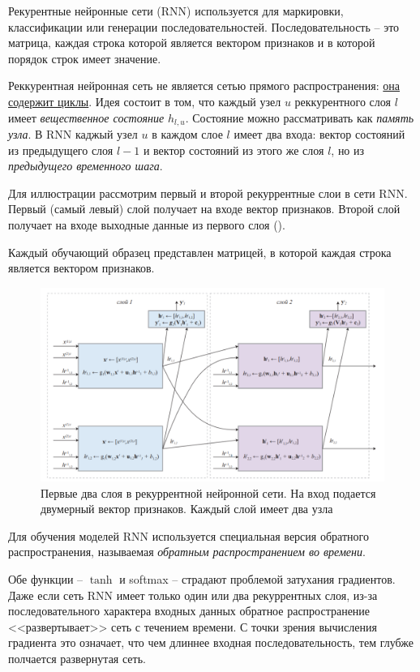 \documentclass[%
	11pt,
	a4paper,
	utf8,
		]{article}
\begin{document}
Рекурентные нейронные сети (RNN) используется для маркировки, классификации или генерации последовательностей. Последовательность -- это матрица, каждая строка которой является вектором признаков и в которой порядок строк имеет значение. 

Реккурентная нейронная сеть не является сетью прямого распространения: \underline{она содержит циклы}. Идея состоит в том, что каждый узел $ u $ реккурентного слоя $ l $ имеет \emph{вещественное состояние} $ h_{l,u} $. Состояние можно рассматривать как \emph{память узла}. В RNN каджый узел $ u $ в каждом слое $ l $ имеет два входа: вектор состояний из предыдущего слоя $ l - 1 $ и вектор состояний из этого же слоя $ l $, но из \emph{предыдущего временного шага}.

Для иллюстрации рассмотрим первый и второй рекуррентные слои в сети RNN. Первый (самый левый) слой получает на входе вектор признаков. Второй слой получает на входе выходные данные из первого слоя ().

Каждый обучающий образец представлен матрицей, в которой каждая строка является вектором признаков. 

\begin{figure}[h]
	\centering
	\includegraphics[scale=0.75]{figures/rnn.png}
	\caption{ Первые два слоя в рекуррентной нейронной сети. На вход подается двумерный вектор признаков. Каждый слой имеет два узла }\label{fig:rnn}
\end{figure}

Для обучения моделей RNN используется специальная версия обратного распространения, называемая \emph{обратным распространением во времени}.

Обе функции -- $ \tanh $ и softmax -- страдают проблемой затухания градиентов. Даже если сеть RNN имеет только один или два рекуррентных слоя, из-за последовательного характера входных данных обратное распространение <<развертывает>> сеть с течением времени. С точки зрения вычисления градиента это означает, что чем длиннее входная последовательность, тем глубже полчается развернутая сеть.
\end{document}
